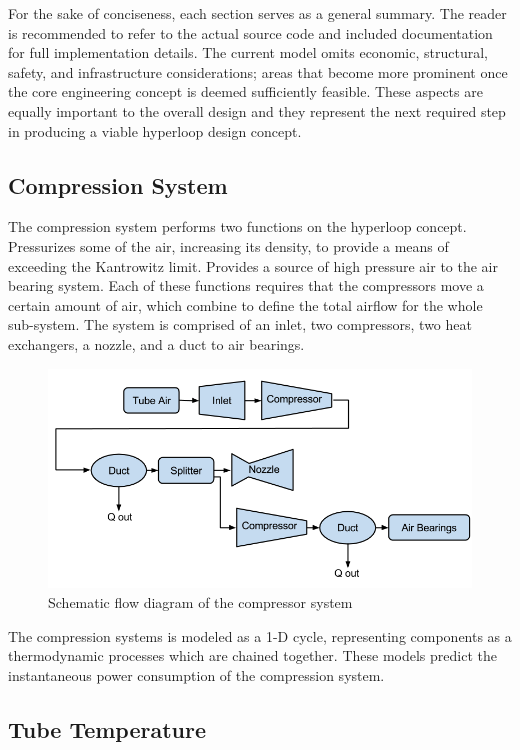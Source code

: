 \documentclass[heading.tex]{subfiles}
\begin{document}
For the sake of conciseness, each section serves as a general summary. The reader is recommended to refer to the actual source code and included documentation for full implementation details. The current model omits economic, structural, safety, and infrastructure considerations; areas that become more prominent once the core engineering concept is deemed sufficiently feasible. These aspects are equally important to the overall design and they represent the next required step in producing a viable hyperloop design concept.

\subsection{Compression System}

The compression system performs two functions on the hyperloop concept.
Pressurizes some of the air, increasing its density, to provide a means of exceeding the Kantrowitz limit.
Provides a source of high pressure air to the air bearing system.
Each of these functions requires that the compressors move a certain amount of air, which combine to define the total airflow for the whole sub-system. The system is comprised of an inlet, two compressors, two heat exchangers, a nozzle, and a duct to air bearings.

\begin{figure}[hbtp]
\centering
\includegraphics[scale=0.5]{images/compressor_schematic.png}
\caption{Schematic flow diagram of the compressor system}
\end{figure}

The compression systems is modeled as a 1-D cycle, representing components as a thermodynamic processes which are chained together. These models predict the instantaneous power consumption of the compression system.

\subsection{Tube Temperature}
\end{document}
